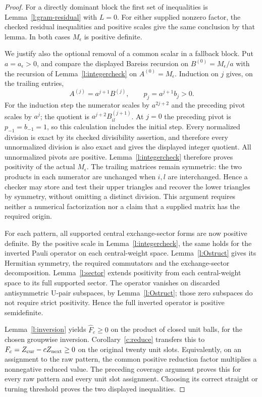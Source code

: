 \begin{proof}
For a directly dominant block the first set of inequalities is
Lemma~\ref{l:gram-residual} with \(L=0\). For either supplied
nonzero factor, the checked residual inequalities and positive
scales give the same conclusion by that lemma. In both cases
\(M_\epsilon\) is positive definite.

We justify also the optional removal of a common scalar in a
fallback block. Put \(a=a_\epsilon>0\), and compare the displayed
Bareiss recursion on \(B^{(0)}=M_\epsilon/a\) with the recursion
of Lemma~\ref{l:integercheck} on \(A^{(0)}=M_\epsilon\).
Induction on \(j\) gives, on the trailing entries,
\[
 A^{(j)}=a^{j+1}B^{(j)},\qquad
 p_j=a^{j+1}b_j>0.
\]
For the induction step the numerator scales by \(a^{2j+2}\)
and the preceding pivot scales by \(a^j\); the quotient is
\(a^{j+2}B^{(j+1)}_{il}\). At \(j=0\) the preceding pivot
is \(p_{-1}=b_{-1}=1\), so this calculation includes the initial
step. Every normalized division is exact by its checked
divisibility assertion, and therefore every unnormalized division
is also exact and gives the displayed integer quotient. All
unnormalized pivots are positive. Lemma~\ref{l:integercheck}
therefore proves positivity of the actual \(M_\epsilon\).
The trailing matrices remain symmetric: the two products in each
numerator are unchanged when \(i,l\) are interchanged. Hence a
checker may store and test their upper triangles and recover the
lower triangles by symmetry, without omitting a distinct division.
This argument requires neither a numerical factorization nor a
claim that a supplied matrix has the required origin.

For each pattern, all supported central exchange-sector forms are
now positive definite. By the positive scale in
Lemma~\ref{l:integercheck}, the same holds for the inverted Pauli
operator on each central-weight space. Lemma~\ref{l:Ostruct}
gives its Hermitian symmetry, the required commutators and the
exchange-sector decomposition. Lemma~\ref{l:sector} extends
positivity from each central-weight space to its full supported
sector. The operator vanishes on discarded antisymmetric U-pair
subspaces, by Lemma~\ref{l:Ostruct}; those zero subspaces do not
require strict positivity. Hence the full inverted operator is
positive semidefinite.

Lemma~\ref{l:inversion} yields
\(\widehat F_c\ge0\) on the product of closed unit balls, for
the chosen groupwise inversion. Corollary~\ref{c:reduce} transfers
this to \(F_c=Z_{\rm cur}-cZ_{\rm next}\ge0\) on the original
twenty unit slots. Equivalently, on an assignment to the raw
pattern, the common positive reduction factor multiplies a
nonnegative reduced value. The preceding coverage argument proves
this for every raw pattern and every unit slot assignment.
Choosing its correct straight or turning threshold proves the
two displayed inequalities.
\end{proof}

